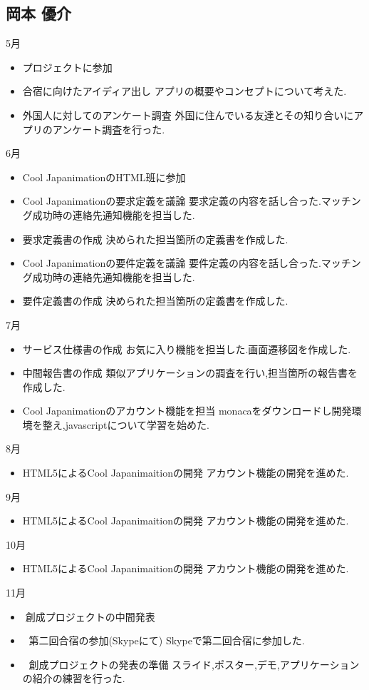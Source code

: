 \subsection{岡本 優介}
5月
\begin{itemize}
\item プロジェクトに参加
\item 合宿に向けたアイディア出し
アプリの概要やコンセプトについて考えた.
\item 外国人に対してのアンケート調査
外国に住んでいる友達とその知り合いにアプリのアンケート調査を行った.
\end{itemize}
6月
\begin{itemize}
\item Cool JapanimationのHTML班に参加
\item Cool Japanimationの要求定義を議論
要求定義の内容を話し合った.マッチング成功時の連絡先通知機能を担当した.
\item 要求定義書の作成
決められた担当箇所の定義書を作成した.
\item Cool Japanimationの要件定義を議論
要件定義の内容を話し合った.マッチング成功時の連絡先通知機能を担当した.
\item 要件定義書の作成
決められた担当箇所の定義書を作成した.
\end{itemize}
7月
\begin{itemize}
\item サービス仕様書の作成
お気に入り機能を担当した.画面遷移図を作成した.
\item 中間報告書の作成
類似アプリケーションの調査を行い,担当箇所の報告書を作成した.
\item Cool Japanimationのアカウント機能を担当
monacaをダウンロードし開発環境を整え,javascriptについて学習を始めた.
\end{itemize}
8月
\begin{itemize}
\item HTML5によるCool Japanimaitionの開発
アカウント機能の開発を進めた.
\end{itemize}
9月
\begin{itemize}
\item HTML5によるCool Japanimaitionの開発
アカウント機能の開発を進めた.
\end{itemize}
10月
\begin{itemize}
\item HTML5によるCool Japanimaitionの開発
アカウント機能の開発を進めた.
\end{itemize}
11月
\begin{itemize}
\item創成プロジェクトの中間発表
\item 	第二回合宿の参加(Skypeにて)
Skypeで第二回合宿に参加した.
\item	創成プロジェクトの発表の準備
スライド,ポスター,デモ,アプリケーションの紹介の練習を行った.
\end{itemize}
